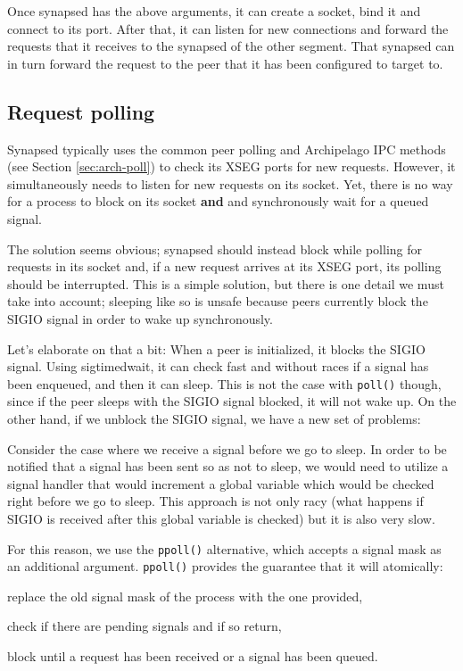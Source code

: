 Once synapsed has the above arguments, it can create a socket, bind it and 
connect to its port. After that, it can listen for new connections and forward 
the requests that it receives to the synapsed of the other segment. That 
synapsed can in turn forward the request to the peer that it has been 
configured to target to.

\subsection{Request polling}\label{sec:poll-synapsed}

Synapsed typically uses the common peer polling and Archipelago IPC methods 
(see Section \ref{sec:arch-poll}) to check its XSEG ports for new requests.  
However, it simultaneously needs to listen for new requests on its socket. Yet, 
there is no way for a process to block on its socket \textbf{and} and 
synchronously wait for a queued signal.

The solution seems obvious; synapsed should instead block while polling for 
requests in its socket and, if a new request arrives at its XSEG port, its 
polling should be interrupted. This is a simple solution, but there is one
detail we must take into account; sleeping like so is unsafe because peers 
currently block the SIGIO signal in order to wake up synchronously.

Let's elaborate on that a bit: When a peer is initialized, it blocks the SIGIO 
signal. Using sigtimedwait, it can check fast and without races if a signal has 
been enqueued, and then it can sleep. This is not the case with \texttt{poll()} 
though, since if the peer sleeps with the SIGIO signal blocked, it will not 
wake up.  On the other hand, if we unblock the SIGIO signal, we have a new set 
of problems:

Consider the case where we receive a signal before we go to sleep. In order to 
be notified that a signal has been sent so as not to sleep, we would need to 
utilize a signal handler that would increment a global variable which would be 
checked right before we go to sleep. This approach is not only racy (what 
happens if SIGIO is received after this global variable is checked) but it is 
also very slow.

For this reason, we use the \texttt{ppoll()} alternative, which accepts a 
signal mask as an additional argument. \texttt{ppoll()} provides the guarantee 
that it will atomically: \begin{inparaenum}[i)]
\item replace the old signal mask of the process with the one provided,
\item check if there are pending signals and if so return,
\item block until a request has been received or a signal has been queued.
\end{inparaenum}

